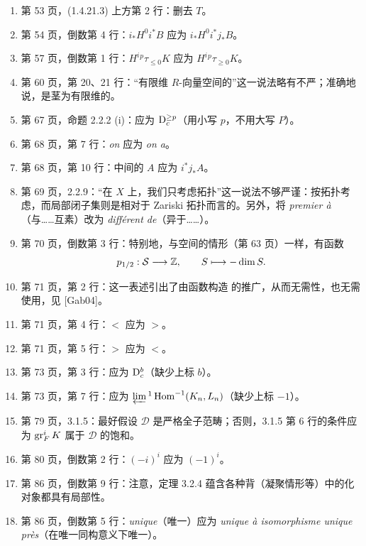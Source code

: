 \begin{enumerate}[label=\arabic*.,leftmargin=2.5em,itemsep=.65\baselineskip]
\item 第 53 页，(1.4.21.3) 上方第 2 行：删去 $T$。
\item 第 54 页，倒数第 4 行：$i_*H^0i^*B$ 应为 $i_*H^0i^*j_*B$。
\item 第 57 页，倒数第 1 行：$H^i{}^p\tau_{\le0}K$ 应为 $H^i{}^p\tau_{\ge0}K$。
\item 第 60 页，第 20、21 行：“有限维 $R$-向量空间的”这一说法略有不严；准确地说，是茎为有限维的。
\item 第 67 页，命题 2.2.2 (i)：应为 $\mathrm{D}_c^{\ge p}$（用小写 $p$，不用大写 $P$）。
\item 第 68 页，第 7 行：\emph{on} 应为 \emph{on a}。
\item 第 68 页，第 10 行：中间的 $A$ 应为 $i^*j_*A$。
\item 第 69 页，2.2.9：“在 $X$ 上，我们只考虑拓扑”这一说法不够严谨：按拓扑考虑，而局部闭子集则是相对于 Zariski 拓扑而言的。另外，将 \emph{premier à}（与……互素）改为 \emph{différent de}（异于……）。
\item 第 70 页，倒数第 3 行：特别地，与空间的情形（第 63 页）一样，有函数
\[
p_{1/2}:\mathcal S\longrightarrow\mathbb Z,\qquad S\longmapsto-\dim S.
\]
\item 第 71 页，第 2 行：这一表述引出了由函数构造 的推广，从而无需性，也无需使用，见 [Gab04]。
\item 第 71 页，第 4 行：$<$ 应为 $>$。
\item 第 71 页，第 5 行：$>$ 应为 $<$。
\item 第 73 页，第 3 行：应为 $\mathrm{D}_c^b$（缺少上标 $b$）。
\item 第 73 页，第 7 行：应为 $\varprojlim{}^1\operatorname{Hom}^{-1}(K_n,L_n)$（缺少上标 $-1$）。
\item 第 79 页，3.1.5：最好假设 $\mathcal D$ 是严格全子范畴；否则，3.1.5 第 6 行的条件应为 $\operatorname{gr}_F^iK$ 属于 $\mathcal D$ 的饱和。
\item 第 80 页，倒数第 2 行：$(-i)^i$ 应为 $(-1)^i$。
\item 第 86 页，倒数第 9 行：注意，定理 3.2.4 蕴含各种背（凝聚情形等）中的化对象都具有局部性。
\item 第 86 页，倒数第 5 行：\emph{unique}（唯一）应为 \emph{unique à isomorphisme unique près}（在唯一同构意义下唯一）。

\end{enumerate}
